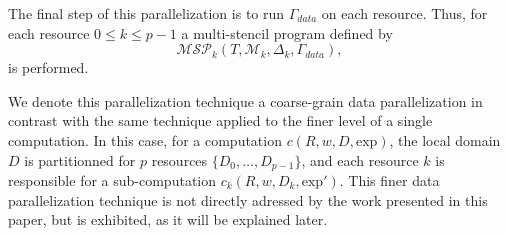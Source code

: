 

 The final step of this parallelization is to run $\Gamma_{data}$ on each resource. Thus, for each resource $0 \leq k \leq p-1$ a multi-stencil program defined by
\begin{equation}
\mathcal{MSP}_k(T,\mathcal{M}_k,\Delta_k,\Gamma_{data}),
\end{equation}
is performed.

We denote this parallelization technique a coarse-grain data parallelization in contrast with the same technique applied to the finer level of a single computation. In this case, for a computation $c(R,w,D,\text{exp})$, the local domain $D$ is partitionned for $p$ resources $\{D_0,\dots,D_{p-1}\}$, and each resource $k$ is responsible for a sub-computation $c_k(R,w,D_k,\text{exp}')$.
This finer data parallelization technique is not directly adressed by the work presented in this paper, but is exhibited, as it will be explained later. 

